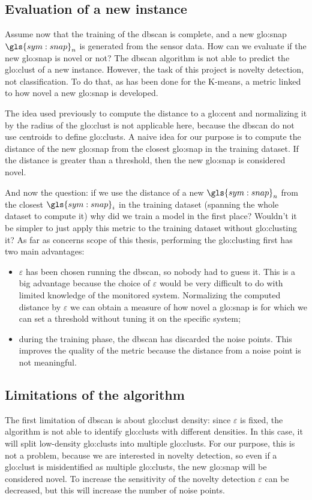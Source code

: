 \subsection{Evaluation of a new instance}
\label{sec:dbscan_eval}
Assume now that the training of the \gls{dbscan} is complete, and a new \gls{glo:snap} $\gls{sym:snap}_n$ is generated from the sensor data. How can we evaluate if the new \gls{glo:snap} is novel or not?
The \gls{dbscan} algorithm is not able to predict the \gls{glo:clust} of a new instance. However, the task of this project is novelty detection, not classification.
To do that, as has been done for the K-means, a metric linked to how novel a new \gls{glo:snap} is developed. 

The idea used previously to compute the distance to a \gls{glo:cent} and normalizing it by the radius of the \gls{glo:clust} is not applicable here, because the \gls{dbscan} do not use centroids to define \gls{glo:clust}s. A naive idea for our purpose is to compute the distance of the new \gls{glo:snap} from the closest \gls{glo:snap} in the training dataset.
If the distance is greater than a threshold, then the new \gls{glo:snap} is considered novel.

And now the question: if we use the distance of a new $\gls{sym:snap}_n$ from the closest $\gls{sym:snap}_i$ in the training dataset (spanning the whole dataset to compute it) why did we train a model in the first place? Wouldn't it be simpler to just apply this metric to the training dataset without \gls{glo:clust}ing it? As far as concerns scope of this thesis, performing the \gls{glo:clust}ing first has two main advantages:
\begin{itemize}
    \item $\varepsilon$ has been chosen running the \gls{dbscan}, so nobody had to guess it. This is a big advantage because the choice of $\varepsilon$ would be very difficult to do with limited knowledge of the monitored system. Normalizing the computed distance by $\varepsilon$ we can obtain a measure of how novel a \gls{glo:snap} is for which we can set a threshold without tuning it on the specific system;
    \item during the training phase, the \gls{dbscan} has discarded the noise points. This improves the quality of the metric because the distance from a noise point is not meaningful.
\end{itemize}

\subsection{Limitations of the algorithm}
The first limitation of \gls{dbscan} is about \gls{glo:clust} density: since $\varepsilon$ is fixed, the algorithm is not able to identify \gls{glo:clust}s with different densities. In this case, it will split low-density \gls{glo:clust}s into multiple \gls{glo:clust}s. For our purpose, this is not a problem, because we are interested in novelty detection, so even if a \gls{glo:clust} is misidentified as multiple \gls{glo:clust}s, the new \gls{glo:snap} will be considered novel. To increase the sensitivity of the novelty detection $\varepsilon$ can be decreased, but this will increase the number of noise points.

